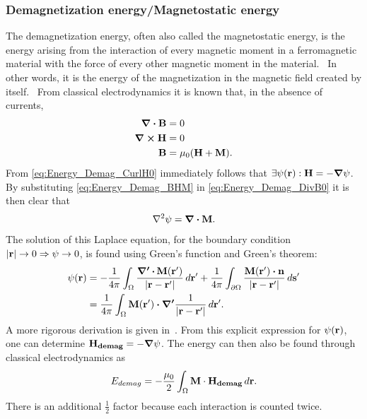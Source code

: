 \documentclass[11pt,a4paper,english]{article}
\begin{document}
\subsubsection{Demagnetization energy/Magnetostatic energy}
The demagnetization energy, often also called the magnetostatic energy, is the energy arising from the interaction of every magnetic moment in a ferromagnetic material with the force of every other magnetic moment in the material.~\cite{NML_Carlton} In other words, it is the energy of the magnetization in the magnetic field created by itself.~\cite{abert2013discrete}
From classical electrodynamics it is known that, in the absence of currents,
\begin{align}
	\div{\vb{B}} &= 0 \label{eq:Energy_Demag_DivB0} \\
	\curl{\vb{H}} &= 0 \label{eq:Energy_Demag_CurlH0} \\
	\vb{B} &= \mu_0 (\vb{H} + \vb{M}) \label{eq:Energy_Demag_BHM} \mathrm{.}
\end{align}
From \cref{eq:Energy_Demag_CurlH0} immediately follows that $\exists \psi(\vb{r}): \vb{H} = -\gradient{\psi}$. By substituting \cref{eq:Energy_Demag_BHM} in \cref{eq:Energy_Demag_DivB0} it is then clear that
\begin{equation}
    \laplacian{\psi} = \div{\vb{M}} \mathrm{.}
\end{equation}
The solution of this Laplace equation, for the boundary condition $\abs{\vb{r}} \rightarrow 0 \Rightarrow \psi \rightarrow 0$, is found using Green's function and Green's theorem:
\begin{align*}
    \psi(\vb{r}) &= -\frac{1}{4\pi}\int_\Omega \frac{\boldsymbol{\nabla'\,\vdot}\,\vb{M}(\vb{r'})}{\abs{\vb{r}-\vb{r'}}} \,d\vb{r'} + \frac{1}{4\pi}\int_{\partial\Omega} \frac{\vb{M}(\vb{r'}) \vdot \vb{n}}{\abs{\vb{r}-\vb{r'}}} \,d\vb{s'} \\
    &= \frac{1}{4\pi}\int_\Omega \vb{M}(\vb{r'}) \vdot \boldsymbol{\nabla'} \frac{1}{\abs{\vb{r}-\vb{r'}}} \,d\vb{r'} \mathrm{.}
\end{align*}
A more rigorous derivation is given in~\cite{abert2013discrete}.
From this explicit expression for $\psi(\vb{r})$, one can determine $\vb{H_{demag}} = -\gradient{\psi}$. The energy can then also be found through classical electrodynamics as
\begin{equation}
    E_{demag} = -\frac{\mu_0}{2} \int_\Omega \vb{M} \cdot \vb{H_{demag}} \, d\vb{r} \mathrm{.} \label{eq:Energy_Term_Demag}
\end{equation}
There is an additional $\frac{1}{2}$ factor because each interaction is counted twice.
\end{document}
